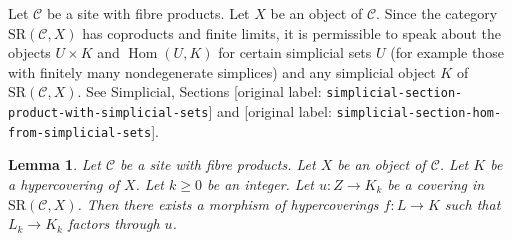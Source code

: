\documentclass[10pt,a4paper]{article}
\theoremstyle{plain}
\newtheorem{lemma}[subsection]{Lemma}
\theoremstyle{definition}
\theoremstyle{remark}
\numberwithin{equation}{subsection}
\def\Hom{\mathop{\mathrm{Hom}}\nolimits}
\begin{document}
\noindent
Let $\mathcal{C}$ be a site with fibre products.
Let $X$ be an object of $\mathcal{C}$.
Since the category $\text{SR}(\mathcal{C}, X)$ has coproducts and
finite limits, it is permissible to speak about the objects
$U \times K$ and $\Hom(U, K)$ for certain simplicial sets $U$
(for example those with finitely many nondegenerate simplices)
and any simplicial object $K$ of $\text{SR}(\mathcal{C}, X)$.
See Simplicial, Sections
\textnormal{[original label: \nolinkurl{simplicial-section-product-with-simplicial-sets}]} and
\textnormal{[original label: \nolinkurl{simplicial-section-hom-from-simplicial-sets}]}.


\begin{lemma}
\label{lemma-covering}
Let $\mathcal{C}$ be a site with fibre products.
Let $X$ be an object of $\mathcal{C}$.
Let $K$ be a hypercovering of $X$.
Let $k \geq 0$ be an integer.
Let $u : Z \to K_k$ be a covering
in $\text{SR}(\mathcal{C}, X)$.
Then there exists a morphism of hypercoverings
$f: L \to K$ such that $L_k \to K_k$
factors through $u$.
\end{lemma}
\end{document}
